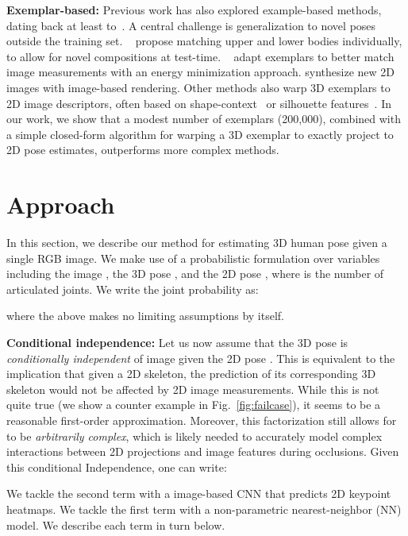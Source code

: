 \documentclass[10pt,twocolumn,letterpaper]{article}
\begin{document}
\textbf{Exemplar-based:} Previous work has also explored example-based methods, dating back at least to~\cite{shakhnarovich2003fast}. A central challenge is generalization to novel poses outside the training set. ~\cite{jiang20103d} propose matching upper and lower bodies individually, to allow for novel compositions at test-time. ~\cite{Yasin_2016_CVPR} adapt exemplars to better match image measurements with an energy minimization approach. \cite{rogez2016mocap} synthesize new 2D images with image-based rendering. Other methods also warp 3D exemplars to 2D image descriptors, often based on shape-context~\cite{agarwal20043d,mori2006recovering} or silhouette features~\cite{IonescuSminchisescu11}.
In our work, we show that a modest number of exemplars (200,000), combined with a simple closed-form algorithm for warping a 3D exemplar to exactly project to 2D pose estimates, outperforms more complex methods.






\section{Approach}
In this section, we describe our method for estimating 3D human pose given a single RGB image. We make use of a probabilistic formulation over variables including the image , the 3D pose , and the 2D pose , where   is the number of articulated joints. We write the joint probability as:

\noindent where the above makes no limiting assumptions by itself.

{\bf Conditional independence:} Let us now assume that the 3D pose  is {\em conditionally independent} of image  given the 2D pose . This is equivalent to the implication that given a 2D skeleton, the prediction of its corresponding 3D skeleton would not be affected by 2D image measurements. While this is not quite true (we show a counter example in Fig.~\ref{fig:failcase}), it seems to be a reasonable first-order approximation. Moreover, this factorization still allows for  to be {\em arbitrarily complex},  which is likely needed to accurately model complex interactions between 2D projections and image features during occlusions. Given this conditional Independence, one can write:

We tackle the second term with a image-based CNN that predicts 2D keypoint heatmaps. We tackle the first term with a non-parametric nearest-neighbor (NN) model. We describe each term in turn below.
\end{document}
